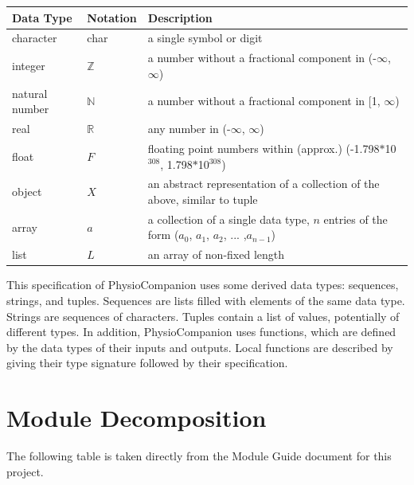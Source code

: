\documentclass[12pt, titlepage]{article}
\begin{document}
\begin{center}
\renewcommand{\arraystretch}{1.2}
\noindent 
\begin{tabular}{l l p{7.5cm}} 
\toprule 
\textbf{Data Type} & \textbf{Notation} & \textbf{Description}\\ 
\midrule
character & char & a single symbol or digit\\
integer & $\mathbb{Z}$ & a number without a fractional component in (-$\infty$, $\infty$) \\
natural number & $\mathbb{N}$ & a number without a fractional component in [1, $\infty$) \\
real & $\mathbb{R}$ & any number in (-$\infty$, $\infty$)\\
float & $F$ & floating point numbers within (approx.) (-1.798$*$10$^{308}$, 1.798$*$10$^{308}$) \\
object & $X$ & an abstract representation of a collection of the above, similar to tuple \\
array & $a$ & a collection of a single data type, $n$ entries of the form ($a_0$, $a_1$, $a_2$, ... ,$a_{n-1}$) \\
list & $L$ & an array of non-fixed length \\
\bottomrule
\end{tabular} 
\end{center}

\noindent
This specification of PhysioCompanion uses some derived data types: sequences, strings, and
tuples. Sequences are lists filled with elements of the same data type. Strings
are sequences of characters. Tuples contain a list of values, potentially of
different types. In addition, PhysioCompanion uses functions, which
are defined by the data types of their inputs and outputs. Local functions are
described by giving their type signature followed by their specification.

\section{Module Decomposition}

The following table is taken directly from the Module Guide document for this project.
\end{document}

